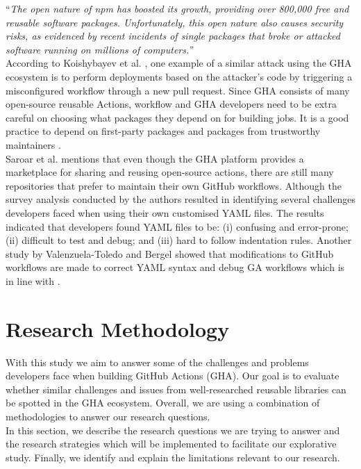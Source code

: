 \documentclass[conference]{IEEEtran}
\begin{document}
“\textit{The open nature of npm has boosted its growth, providing over 800,000 free and reusable software packages. Unfortunately, this open nature also causes security risks, as evidenced by recent incidents of single packages that broke or attacked software running on millions of computers.”} \\

According to Koishybayev et al. \cite{koishybayev2022characterizing}, one example of a similar attack using the GHA ecosystem is to perform deployments based on the attacker’s code by triggering a misconfigured workflow through a new pull request. Since GHA consists of many open-source reusable Actions, workflow and GHA developers need to be extra careful on choosing what packages they depend on for building jobs. It is a good practice to depend on first-party packages and packages from trustworthy maintainers \cite{zimmermann2019small}. \\

Saroar et al. \cite{saroar2023developers} mentions that even though the GHA platform provides a marketplace for sharing and reusing open-source actions, there are still many repositories that prefer to maintain their own GitHub workflows. Although the survey analysis conducted by the authors resulted in identifying several challenges developers faced when using their own customised YAML files.  The results indicated that developers found YAML files to be: (i) confusing and error-prone; (ii) difficult to test and debug; and (iii) hard to follow indentation rules. Another study by Valenzuela-Toledo and Bergel \cite{valenzuela2022evolution}  showed that modifications to GitHub workflows are made to correct YAML syntax and debug GA workflows which is in line with \cite{saroar2023developers}.


\section{Research Methodology}
With this study we aim to answer some of the challenges and problems developers face when building GitHub Actions (GHA). Our goal is to evaluate whether similar challenges and issues from well-researched reusable libraries can be spotted in the GHA ecosystem. Overall,  we are using a combination of methodologies to answer our research questions.\\

In this section, we describe the research questions we are trying to answer and the research strategies which will be implemented to facilitate our explorative study. Finally, we identify and explain the limitations relevant to our research.
\end{document}

